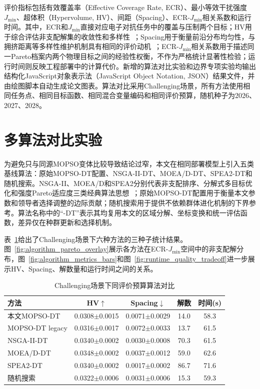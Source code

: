 评价指标包括有效覆盖率（Effective Coverage Rate, ECR）、最小等效干扰强度$J_{\min}$、超体积（Hypervolume, HV）、间距（Spacing）、ECR-$J_{\min}$相关系数和运行时间。其中，ECR和$J_{\min}$直接对应电子对抗任务中的覆盖与压制两个目标；HV用于综合评估非支配解集的收敛性和多样性~\cite{Zitzler2001}；Spacing用于衡量前沿分布均匀性，与拥挤距离等多样性维护机制具有相同的评价动机~\cite{Deb2002,Raquel2005}；ECR-$J_{\min}$相关系数用于描述同一Pareto档案内两个物理目标之间的经验性权衡，不作为严格统计显著性检验；运行时间则反映工程部署中的计算代价。新增的算法对比实验和边界专项实验均输出结构化JavaScript对象表示法（JavaScript Object Notation, JSON）结果文件，并由绘图脚本自动生成论文图表。算法对比采用Challenging场景，所有方法使用相同任务点、相同目标函数、相同混合变量编码和相同评价预算，随机种子为2026、2027、2028。

\section{多算法对比实验}

为避免只与同源MOPSO变体比较导致结论过窄，本文在相同部署模型上引入五类基线算法：原始MOPSO-DT配置、NSGA-II-DT、MOEA/D-DT、SPEA2-DT和随机搜索。NSGA-II、MOEA/D和SPEA2分别代表非支配排序、分解式多目标优化和强度Pareto适应度三类经典算法思想~\cite{Deb2002,Zhang2007,Zitzler2001}；原始MOPSO-DT配置用于衡量本文参数和领导者选择调整的边际贡献；随机搜索用于提供不依赖群体进化机制的下界参考。算法名称中的``-DT''表示其均复用本文的区域分解、坐标变换和统一评估函数，差异仅在种群更新和选择机制。

表~\ref{tab:algorithm_comparison}给出了Challenging场景下六种方法的三种子统计结果。图~\ref{fig:algorithm_pareto_overlay}展示各方法在ECR-$J_{\min}$空间中的非支配解分布，图~\ref{fig:algorithm_metrics_bars}和图~\ref{fig:runtime_quality_tradeoff}进一步展示HV、Spacing、解数量和运行时间之间的关系。

\begin{table}[!htbp]
\centering
\caption{Challenging场景下同评价预算算法对比}
\label{tab:algorithm_comparison}
\begin{tabular*}{\textwidth}{@{\extracolsep{\fill}}lcccc@{}}
\toprule
方法 & HV$\uparrow$ & Spacing$\downarrow$ & 解数 & 时间(s) \\
\midrule
本文MOPSO-DT & 0.0308$\pm$0.0015 & 0.0071$\pm$0.0029 & 14.0 & 58.3 \\
MOPSO-DT legacy & 0.0316$\pm$0.0017 & 0.0072$\pm$0.0033 & 13.7 & 61.5 \\
NSGA-II-DT & 0.0340$\pm$0.0002 & 0.0030$\pm$0.0008 & 70.3 & 61.5 \\
MOEA/D-DT & 0.0348$\pm$0.0002 & 0.0037$\pm$0.0012 & 59.0 & 62.6 \\
SPEA2-DT & 0.0340$\pm$0.0002 & 0.0017$\pm$0.0002 & 86.7 & 71.6 \\
随机搜索 & 0.0322$\pm$0.0006 & 0.0031$\pm$0.0006 & 15.3 & 59.3 \\
\bottomrule
\end{tabular*}
\end{table}

